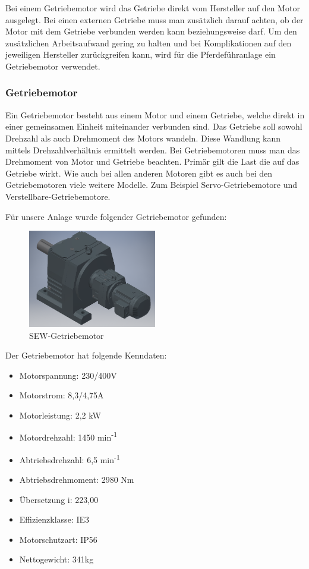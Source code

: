 Bei einem Getriebemotor wird das Getriebe direkt vom Hersteller auf den Motor ausgelegt. Bei einen externen Getriebe muss man zusätzlich darauf achten, ob der Motor mit dem Getriebe verbunden werden kann beziehungsweise darf. Um den zusätzlichen Arbeitsaufwand gering zu halten und bei Komplikationen auf den jeweiligen Hersteller zurückgreifen kann, wird für die Pferdeführanlage ein Getriebemotor verwendet.

\subsubsection{Getriebemotor}
\label{sec:getriebemotor}

Ein Getriebemotor  besteht aus einem Motor und einem Getriebe, welche direkt in einer gemeinsamen Einheit miteinander verbunden sind. Das Getriebe soll sowohl Drehzahl als auch Drehmoment des Motors wandeln. Diese Wandlung kann mittels Drehzahlverhältnis ermittelt werden. Bei Getriebemotoren muss man das Drehmoment von Motor und Getriebe beachten. Primär gilt die Last die auf das Getriebe wirkt. 
Wie auch bei allen anderen Motoren gibt es auch bei den Getriebemotoren viele weitere Modelle. Zum Beispiel Servo-Getriebemotore und Verstellbare-Getriebemotore.

Für unsere Anlage wurde folgender Getriebemotor gefunden:

\begin{figure}[!ht]
\begin{center}
	\caption{SEW-Getriebemotor}
	\includegraphics[width=0.5\textwidth]{SEWGetriebemotor}
\end{center}
\end{figure}

Der Getriebemotor hat folgende Kenndaten:

\begin{itemize}
	\item{Motorspannung: 230/400V}
	\item{Motorstrom: 8,3/4,75A}
	\item{Motorleistung: 2,2 kW}
	\item{Motordrehzahl: 1450 min\textsuperscript{-1}}
	\item{Abtriebsdrehzahl: 6,5 min\textsuperscript{-1}}
	\item{Abtriebsdrehmoment: 2980 Nm}
	\item{Übersetzung i: 223,00}
	\item{Effizienzklasse: IE3}
	\item{Motorschutzart: IP56}
	\item{Nettogewicht: 341kg}
\end{itemize}


